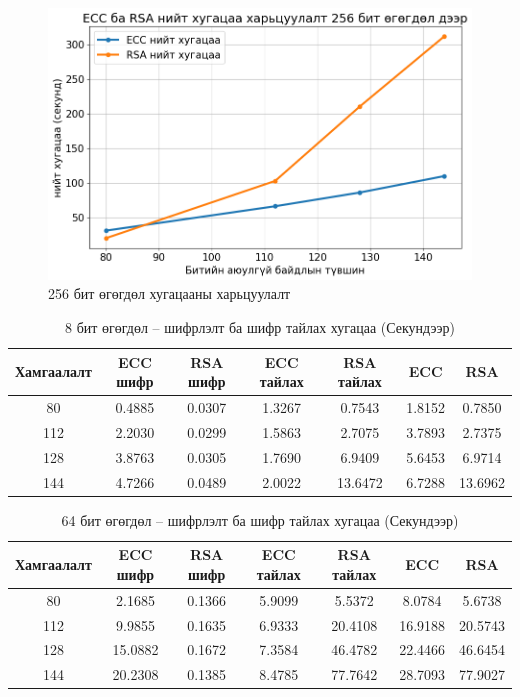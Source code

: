 	\begin{figure}[h]
		\centering
		\includegraphics[scale=0.65]{assets/graphs/9.png}
		\caption{256 бит өгөгдөл хугацааны харьцуулалт}
		\label{fig:architecture}
	\end{figure}
	
	
	\begin{table}
	\centering
	\caption{8 бит өгөгдөл – шифрлэлт ба шифр тайлах хугацаа (Секундээр) \cite{RSAvsECC}}
	\begin{tabular}{|c|c|c|c|c|c|c|}
	\hline
	Хамгаалалт & ECC шифр & RSA шифр & ECC тайлах & RSA тайлах & ECC & RSA \\
	\hline
	80 & 0.4885 & 0.0307 & 1.3267 & 0.7543 & 1.8152 & 0.7850 \\
	112 & 2.2030 & 0.0299 & 1.5863 & 2.7075 & 3.7893 & 2.7375 \\
	128 & 3.8763 & 0.0305 & 1.7690 & 6.9409 & 5.6453 & 6.9714 \\
	144 & 4.7266 & 0.0489 & 2.0022 & 13.6472 & 6.7288 & 13.6962 \\
	\hline
	\end{tabular}
	\end{table}
	
	\begin{table}
	\centering
	\caption{64 бит өгөгдөл – шифрлэлт ба шифр тайлах хугацаа (Секундээр) \cite{RSAvsECC}}
	\begin{tabular}{|c|c|c|c|c|c|c|}
	\hline
	Хамгаалалт & ECC шифр & RSA шифр & ECC тайлах & RSA тайлах & ECC  & RSA  \\
	\hline
	80 & 2.1685 & 0.1366 & 5.9099 & 5.5372 & 8.0784 & 5.6738 \\
	112 & 9.9855 & 0.1635 & 6.9333 & 20.4108 & 16.9188 & 20.5743 \\
	128 & 15.0882 & 0.1672 & 7.3584 & 46.4782 & 22.4466 & 46.6454 \\
	144 & 20.2308 & 0.1385 & 8.4785 & 77.7642 & 28.7093 & 77.9027 \\
	\hline
	\end{tabular}
	\end{table}
	
